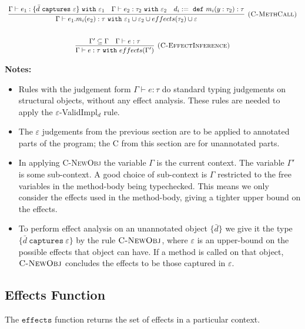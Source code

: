 \documentclass{llncs}
\newcommand{\keywadj}[1]{\mathtt{#1}}
\newcommand{\keyw}[1]{\keywadj{#1}~}
\begin{document}
\[
\begin{array}{c}
\infer[\textsc{(C-MethCall)}]
	{\Gamma \vdash e_1.m_i(e_2) : \tau~ \keyw{with} \varepsilon_1 \cup \varepsilon_2 \cup effects(\tau_2) \cup \varepsilon}
	{\Gamma \vdash e_1 : \{ \bar d~\keyw{captures} \varepsilon \}~\keyw{with} \varepsilon_1 & \Gamma \vdash e_2:\tau_2~\keyw{with} \varepsilon_2&d_i :=~\keyw{def} m_i(y:\tau_2):\tau } \\[5ex]
	
\infer[\textsc{(C-EffectInference)}]
	{\Gamma \vdash e : \tau~\keyw{with} effects(\Gamma')}
	{\Gamma' \subseteq \Gamma & \Gamma \vdash e : \tau}
	
\end{array}
\]



\noindent \textbf{Notes:}

\begin{itemize}
	\item Rules with the judgement form $\Gamma \vdash e : \tau$ do standard typing judgements on structural objects, without any effect analysis. These rules are needed to apply the $\varepsilon$-ValidImpl$_d$ rule.
	\item The \textsc{$\varepsilon$} judgements from the previous section are to be applied to annotated parts of the program; the \textsc{C} from this section are for unannotated parts.
	\item In applying \textsc{C-NewObj} the variable $\Gamma$ is the current context. The variable $\Gamma'$ is some sub-context. A good choice of sub-context is $\Gamma$ restricted to the free variables in the method-body being typechecked. This means we only consider the effects used in the method-body, giving a tighter upper bound on the effects.
	\item To perform effect analysis on an unannotated object $\{ \bar d \}$ we give it the type $\{ \bar d~\keyw{captures} \varepsilon \}$ by the rule $\textsc{C-NewObj}$, where $\varepsilon$ is an upper-bound on the possible effects that object can have. If a method is called on that object, $\textsc{C-NewObj}$ concludes the effects to be those captured in $\varepsilon$.
\end{itemize}

\subsection{Effects Function}

\noindent
The $\keywadj{effects}$ function returns the set of effects in a particular context. \\
\end{document}
